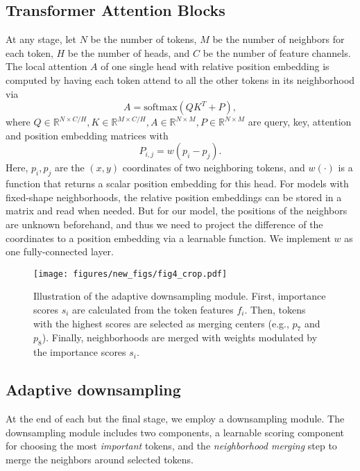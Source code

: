 \documentclass[10pt,twocolumn,letterpaper]{article}
\begin{document}
\subsection{Transformer Attention Blocks}\label{sec:attention}
At any stage, let $N$ be the number of tokens, $M$ be the number of neighbors for each token, $H$ be the number of heads, and $C$ be the number of feature channels. 
The local attention $A$ of one single head with relative position embedding is computed by having each token attend to all the other tokens in its neighborhood via
\begin{equation}
    A = \text{softmax}(QK^T+P),
\end{equation}
where 
$Q\in \mathbb{R}^{N\times C/H}, K\in \mathbb{R}^{M\times C/H}, A\in \mathbb{R}^{N\times M}, P\in \mathbb{R}^{N\times M}$ 
are query, key, attention and position embedding matrices with
\begin{equation}
    P_{i,j} = w(p_i-p_j). \end{equation}
Here, $p_i,p_j$ are the $(x,y)$ coordinates of two neighboring tokens, and $w(\cdot)$ is a function that returns a scalar position embedding for this head. For models with fixed-shape neighborhoods, the relative position embeddings can be stored in a matrix and read when needed. But for our model, the positions of the neighbors are unknown beforehand, and thus we need to project the difference of the coordinates to a position embedding via a learnable function. We implement $w$ as one fully-connected layer.


\begin{figure}
\centering
\texttt{[image: figures/new\_figs/fig4\_crop.pdf]}
\vskip -0.15in 
\caption{Illustration of the adaptive downsampling module. First, importance scores $s_i$ are calculated from the token features $f_i$. Then, tokens with the highest scores are selected as merging centers (e.g., $p_7$ and $p_8$). Finally, neighborhoods are merged with weights modulated by the importance scores $s_i$.}
\label{fig:merge}
\vskip -0.1in
\end{figure}


\subsection{Adaptive downsampling}\label{sec:adads}

At the end of each but the final stage, we employ a downsampling module. The downsampling module includes two components, a learnable scoring component for choosing the most \textit{important} tokens, and the \textit{neighborhood merging} step to merge the neighbors around selected tokens. 
\end{document}
